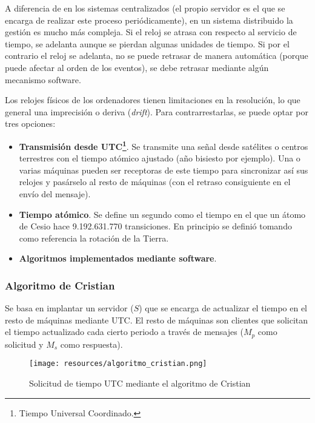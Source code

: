 \documentclass[a4paper, 11pt, titlepage]{article}
\begin{document}
        A diferencia de en los sistemas centralizados (el propio servidor es el que se encarga de 
        realizar este proceso periódicamente), en un sistema distribuido la gestión es mucho más 
        compleja. Si el reloj se atrasa con respecto al servicio de tiempo, se adelanta aunque se 
        pierdan algunas unidades de tiempo. Si por el contrario el reloj se adelanta, no se puede 
        retrasar de manera automática (porque puede afectar al orden de los eventos), se debe 
        retrasar mediante algún mecanismo software.

        Los relojes físicos de los ordenadores tienen limitaciones en la resolución, lo que general 
        una imprecisión o deriva (\textit{drift}). Para contrarrestarlas, se puede optar por tres 
        opciones:

        \begin{itemize}
            \item \textbf{Transmisión desde UTC\footnote{
                Tiempo Universal Coordinado.
            }}. Se transmite una señal desde satélites 
            o centros terrestres con el tiempo atómico ajustado (año bisiesto por ejemplo). Una o 
            varias máquinas pueden ser receptoras de este tiempo para sincronizar así sus relojes 
            y pasárselo al resto de máquinas (con el retraso consiguiente en el envío del mensaje).
            \item \textbf{Tiempo atómico}. Se define un segundo como el tiempo en el que un átomo 
            de Cesio hace 9.192.631.770 transiciones. En principio se definió tomando como 
            referencia la rotación de la Tierra.
            \item \textbf{Algoritmos implementados mediante software}.
        \end{itemize}

        \subsubsection{Algoritmo de Cristian}

            Se basa en implantar un servidor ($S$) que se encarga de actualizar el tiempo en el resto 
            de máquinas mediante UTC. El resto de máquinas son clientes que solicitan el tiempo 
            actualizado cada cierto periodo a través de mensajes ($M_p$ como solicitud y $M_s$ como 
            respuesta).

            \begin{figure}[htp]
                \centering
                \texttt{[image: resources/algoritmo\_cristian.png]}
                \caption{Solicitud de tiempo UTC mediante el algoritmo de Cristian}
                \label{algoritmo_cristian}
            \end{figure}
\end{document}
